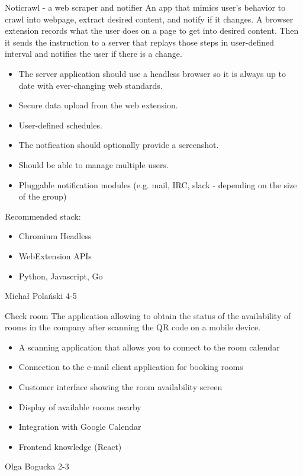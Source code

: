 \begin{project}
{Noticrawl - a web scraper and notifier}
{An app that mimics user's behavior to crawl into webpage, extract desired content, and notify if it changes.
A browser extension records what the user does on a page to get into desired content. Then it sends the instruction to a server that replays those steps in user-defined interval and notifies the user if there is a change.}
{
\begin{itemize}
	\item The server application should use a headless browser so it is always up to date with ever-changing web standards.
	\item Secure data upload from the web extension.
	\item User-defined schedules.
	\item The notfication should optionally provide a screenshot.
	\item Should be able to manage multiple users.
	\item Pluggable notification modules (e.g. mail, IRC, slack - depending on the size of the group)
\end{itemize}
}
{
Recommended stack:
\begin{itemize}
	\item Chromium Headless
	\item WebExtension APIs
	\item Python, Javascript, Go
\end{itemize}
}
{Michał Polański}
{4-5}
\end{project}
\begin{project}
{Check room}
{
The application allowing to obtain the status of the availability of rooms in the company after scanning the QR code on a mobile device.
}
{
\begin{itemize}
	\item A scanning application that allows you to connect to the room calendar
	\item Connection to the e-mail client application for booking rooms
	\item Customer interface showing the room availability screen
	\item Display of available rooms nearby
	\item Integration with Google Calendar
\end{itemize}
}
{
\begin{itemize}
	\item Frontend knowledge (React)
\end{itemize}
}
{Olga Bogucka}
{2-3}
\end{project}
